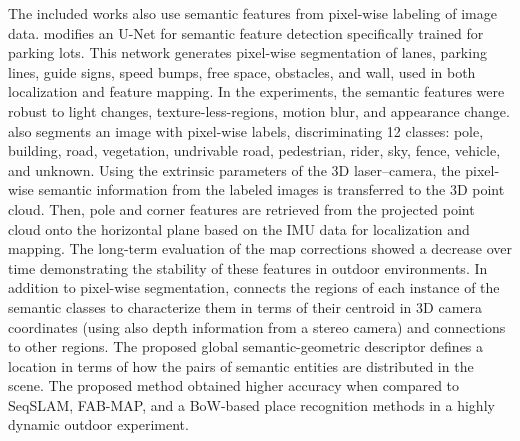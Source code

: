 The included works also use semantic features from pixel-wise labeling of image data.
\cite{qin-et-al:2020:9340939} modifies an U-Net for semantic feature detection specifically trained for parking lots. This network generates pixel-wise segmentation of lanes, parking lines, guide signs, speed bumps, free space, obstacles, and wall, used in both localization and feature mapping. In the experiments, the semantic features were robust to light changes, texture-less-regions, motion blur, and appearance change.
\cite{berrio-et-al:2021:3094485} also segments an image with pixel-wise labels, discriminating 12 classes: pole, building, road, vegetation, undrivable road, pedestrian, rider, sky, fence, vehicle, and unknown. Using the extrinsic parameters of the 3D laser--camera, the pixel-wise semantic information from the labeled images is transferred to the 3D point cloud. Then, pole and corner features are retrieved from the projected point cloud onto the horizontal plane based on the IMU data for localization and mapping. The long-term evaluation of the map corrections showed a decrease over time demonstrating the stability of these features in outdoor environments.
In addition to pixel-wise segmentation, \cite{singh-et-al:2021:9564866} connects the regions of each instance of the semantic classes to characterize them in terms of their centroid in 3D camera coordinates (using also depth information from a stereo camera) and connections to other regions. The proposed global semantic-geometric descriptor defines a location in terms of how the pairs of semantic entities are distributed in the scene. The proposed method obtained higher accuracy when compared to SeqSLAM, FAB-MAP, and a BoW-based place recognition methods in a highly dynamic outdoor experiment.

